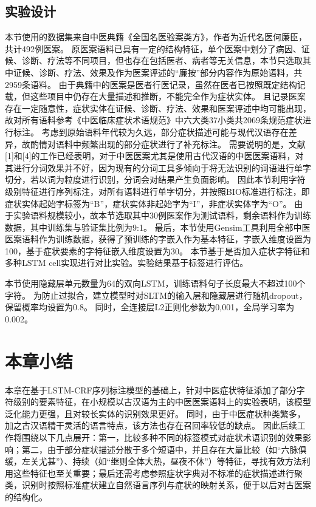 \subsection{实验设计}
本节使用的数据集来自中医典籍《全国名医验案类方》，作者为近代名医何廉臣，共计492例医案。
原医案语料已具有一定的结构特征，单个医案中划分了病因、证候、诊断、疗法等不同项目，但也存在包括医者、病者等无关信息，本节只选取其中证候、诊断、疗法、效果及作为医案评述的“廉按”部分内容作为原始语料，共2959条语料。
由于典籍中的医案是医者行医记录，虽然在医者已按照既定结构记载，但这些项目中仍存在大量描述和推断，不能完全作为症状实体。
且记录医案存在一定随意性，症状实体在证候、诊断、疗法、效果和医案评述中均可能出现，故对所有语料参考《中医临床症状术语规范》中六大类37小类共2069条规范症状进行标注。
考虑到原始语料年代较为久远，部分症状描述可能与现代汉语存在差异，故酌情对语料中频繁出现的部分症状进行了补充标注。
需要说明的是，文献[1]和[4]的工作已经表明，对于中医医案尤其是使用古代汉语的中医医案语料，对其进行分词效果并不好，因为现有的分词工具多倾向于将无法识别的词语进行单字切分，若以词为粒度进行识别，分词会对结果产生负面影响。
因此本节利用字符级别特征进行序列标注，对所有语料进行单字切分，并按照BIO标准进行标注，即症状实体起始字标签为“B”，症状实体非起始字为“I”，非症状实体字为“O”。
由于实验语料规模较小，故本节选取其中30例医案作为测试语料，剩余语料作为训练数据，其中训练集与验证集比例为9:1。
最后，本节使用Gensim工具利用全部中医医案语料作为训练数据，获得了预训练的字嵌入作为基本特征，字嵌入维度设置为100，基于症状要素的字特征嵌入维度设置为30。
本节基于是否加入症状字特征和多种LSTM cell实现进行对比实验。实验结果基于标签进行评估。

本节使用隐藏层单元数量为64的双向LSTM，训练语料句子长度最大不超过100个字符。
为防止过拟合，建立模型时对SLTM的输入层和隐藏层进行随机dropout，保留概率均设置为0.8。
同时，全连接层L2正则化参数为0,001，全局学习率为0.002。



\section{本章小结}

本章在基于LSTM-CRF序列标注模型的基础上，针对中医症状特征添加了部分字符级别的要素特征，在小规模以古汉语为主的中医医案语料上的实验表明，该模型泛化能力更强，且对较长实体的识别效果更好。
同时，由于中医症状种类繁多，加之古汉语精干灵活的语言特点，该方法也存在召回率较低的缺点。
因此后续工作将围绕以下几点展开：第一，比较多种不同的标签模式对症状术语识别的效果影响；第二，由于部分症状描述分散于多个短语中，并且存在大量比较（如“六脉俱缓，左关尤甚”）、持续（如“继则全体大热，昼夜不休”）等特征，寻找有效方法利用这些特征也至关重要；最后还需考虑参照症状字典对不标准的症状描述进行聚类，识别时按照标准症状建立自然语言序列与症状的映射关系，便于以后对古医案的结构化。

